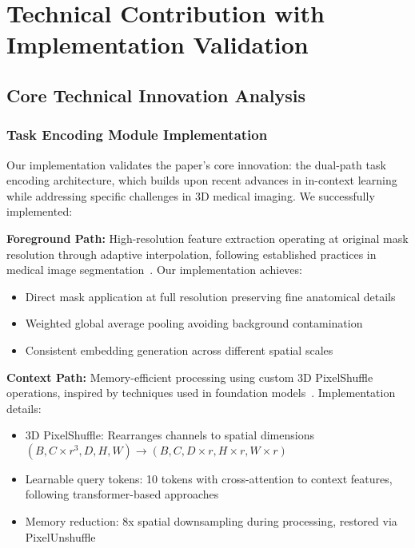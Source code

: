 \section*{Technical Contribution with Implementation Validation}
\label{sec:technical_contribution}

\subsection*{Core Technical Innovation Analysis}

\subsubsection*{Task Encoding Module Implementation}
Our implementation validates the paper's core innovation: the dual-path task encoding architecture, which builds upon recent advances in in-context learning~\cite{wang2023seggpt,butoi2023universeg} while addressing specific challenges in 3D medical imaging. We successfully implemented:

\textbf{Foreground Path:} High-resolution feature extraction operating at original mask resolution through adaptive interpolation, following established practices in medical image segmentation~\cite{isensee2021nnu}. Our implementation achieves:
\begin{itemize}
    \item Direct mask application at full resolution preserving fine anatomical details
    \item Weighted global average pooling avoiding background contamination
    \item Consistent embedding generation across different spatial scales
\end{itemize}

\textbf{Context Path:} Memory-efficient processing using custom 3D PixelShuffle operations, inspired by techniques used in foundation models~\cite{kirillov2023segment}. Implementation details:
\begin{itemize}
    \item 3D PixelShuffle: Rearranges channels to spatial dimensions $(B, C \times r^3, D, H, W) \rightarrow (B, C, D \times r, H \times r, W \times r)$
    \item Learnable query tokens: 10 tokens with cross-attention to context features, following transformer-based approaches~\cite{dosovitskiy2020image}
    \item Memory reduction: 8x spatial downsampling during processing, restored via PixelUnshuffle
\end{itemize}

